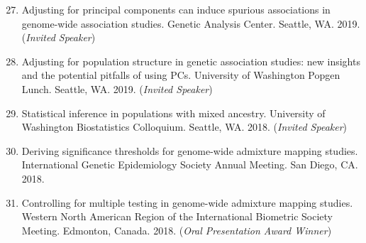 \documentclass[margin]{res}
\newenvironment{benumerate}[1]{
    \let\oldItem\item
    \def\item{\addtocounter{enumi}{-2}\oldItem}
    
    \begin{enumerate}
    \setcounter{enumi}{#1}
    \addtocounter{enumi}{1}
}{
    \end{enumerate}
}
\begin{document}
\begin{resume}
\begin{benumerate}{26}
\item Adjusting for principal components can induce spurious associations in genome-wide association studies. Genetic Analysis Center. Seattle, WA. 2019. (\textit{Invited Speaker})

\item Adjusting for population structure in genetic association studies: new insights and the potential pitfalls of using PCs. University of Washington Popgen Lunch. Seattle, WA. 2019.  (\textit{Invited Speaker})




\item %
Statistical inference in populations with mixed ancestry. University of Washington Biostatistics Colloquium. Seattle, WA. 2018.  (\textit{Invited Speaker})

\item %
Deriving significance thresholds for genome-wide admixture mapping studies. International Genetic Epidemiology Society Annual Meeting. San Diego, CA. 2018. 


\item %
Controlling for multiple testing in genome-wide admixture mapping studies. Western North American Region of the International Biometric Society Meeting. Edmonton, Canada. 2018. (\textit{Oral Presentation Award Winner})




\end{benumerate}
\end{resume}
\end{document}
